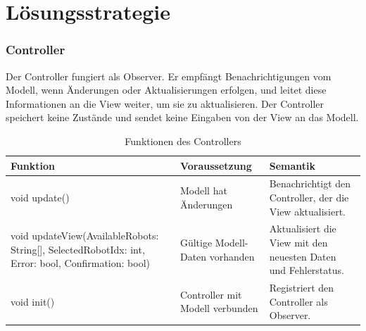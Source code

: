 \chapter{Lösungsstrategie}

\subsection{Controller}
Der Controller fungiert als Observer. 
Er empfängt Benachrichtigungen vom Modell, wenn Änderungen oder Aktualisierungen erfolgen, und leitet diese Informationen an die View weiter, um sie zu aktualisieren. 
Der Controller speichert keine Zustände und sendet keine Eingaben von der View an das Modell.

\begin{table}[h!]
    \centering
    \begin{tabular}{|p{5cm}|p{5cm}|p{5cm}|}
        \hline
        \textbf{Funktion} & \textbf{Voraussetzung} & \textbf{Semantik} \\
        \hline
       void update() & Modell hat Änderungen & Benachrichtigt den Controller, der die View aktualisiert. \\
        \hline
        void updateView(AvailableRobots: String[], SelectedRobotIdx: int, Error: bool, Confirmation: bool) & Gültige Modell-Daten vorhanden & Aktualisiert die View mit den neuesten Daten und Fehlerstatus. \\
        \hline
        void init() & Controller mit Modell verbunden & Registriert den Controller als Observer. \\
        \hline
    \end{tabular}
    \caption{Funktionen des Controllers}
    \label{tab:Controller}
\end{table}

\clearpage
